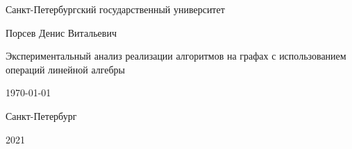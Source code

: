 \begin{titlepage}
\begin{center}
Санкт-Петербургский
государственный университет \\[3mm]

\vspace{65mm}

\begin{large} 
Порсев Денис Витальевич \\[3mm]
\end{large}

\vspace{3mm}

\begin{Large}
Экспериментальный анализ
реализации алгоритмов на графах
с использованием операций линейной алгебры
\end{Large} 

\vspace{3mm}

\begin{large}
\today
\end{large}

\vfill 

{Санкт-Петербург}
\par{2021}
\end{center}
\end{titlepage}
\restoregeometry
\addtocounter{page}{1}